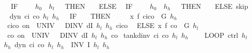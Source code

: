 \documentclass[envcountsame,envcountsect]{llncs}
\begin{document}
\begin{example}
\begin{isabellebody}
\ \ {\isacharparenleft}IF\ {\isacharparenleft}{\isasympi}\ {\isacharequal}\ {}\ {\isasymand}\ $h_0$\ {\isasymle}\ $h_l$\ {\isacharplus}\ {}{\isacharparenright}\ THEN\ {\isacharparenleft}{\isasympi}\ {\isacharcolon}{\isacharcolon}{\isacharequal}\ {}{\isacharparenright}\ ELSE\isanewline
\ \ {\isacharparenleft}IF\ {\isacharparenleft}{\isasympi}\ {\isacharequal}\ {}\ {\isasymand}\ $h_0$\ {\isasymge}\ $h_h$\ {\isacharminus}\ {}{\isacharparenright}\ THEN\ {\isacharparenleft}{\isasympi}\ {\isacharcolon}{\isacharcolon}{\isacharequal}\ {}{\isacharparenright}\ ELSE\ skip{\isacharparenright}{\isacharparenright}{\isachardoublequoteclose}\isanewline
\isanewline
{}\ %
{\isachardoublequoteopen}dyn\ c\isactrlsub i\ c\isactrlsub o\ $h_l$\ $h_h$\ {\isasymtau}\ {\isasymequiv}\ IF\ {\isacharparenleft}{\isasympi}\ {\isacharequal}\ {}{\isacharparenright}\ THEN\ \isanewline
\ \ \ \ x{\isasymacute}{\isacharequal}\ f\ {\isacharparenleft}c\isactrlsub i{\isacharminus}c\isactrlsub o{\isacharparenright}\ {\isacharampersand}\ G\ $h_h$\ {\isacharparenleft}c\isactrlsub i{\isacharminus}c\isactrlsub o{\isacharparenright}\ on\ {\isacharbraceleft}{}{\isachardot}{\isachardot}{\isasymtau}{\isacharbraceright}\ UNIV\ {\isacharat}\ {}\ DINV\ {\isacharparenleft}dI\ $h_l$\ $h_h$\ {\isacharparenleft}c\isactrlsub i{\isacharminus}c\isactrlsub o{\isacharparenright}{\isacharparenright}\isanewline
\ \ ELSE\ x{\isasymacute}{\isacharequal}\ f\ {\isacharparenleft}{\isacharminus}c\isactrlsub o{\isacharparenright}\ {\isacharampersand}\ G\ $h_l$\ {\isacharparenleft}{\isacharminus}c\isactrlsub o{\isacharparenright}\ on\ {\isacharbraceleft}{}{\isachardot}{\isachardot}{\isasymtau}{\isacharbraceright}\ UNIV\ {\isacharat}\ {}\ DINV\ {\isacharparenleft}dI\ $h_l$\ $h_h$\ {\isacharparenleft}{\isacharminus}c\isactrlsub o{\isacharparenright}{\isacharparenright}{\isachardoublequoteclose}\isanewline
\isanewline
{}\isamarkupfalse%
\ {\isachardoublequoteopen}tank{\isacharunderscore}dinv\ c\isactrlsub i\ c\isactrlsub o\ $h_l$\ $h_h$\ {\isasymtau}\ {\isasymequiv}\isanewline 
\ \ LOOP\ {\isacharparenleft}ctrl\ $h_l$\ $h_h${\isacharsemicolon}\ dyn\ c\isactrlsub i\ c\isactrlsub o\ $h_l$\ $h_h$\ {\isasymtau}{\isacharparenright}\ INV\ {\isacharparenleft}I\ $h_l$\ $h_h${\isacharparenright}{\isachardoublequoteclose}\isanewline
\end{isabellebody}


\end{example}
\end{document}
